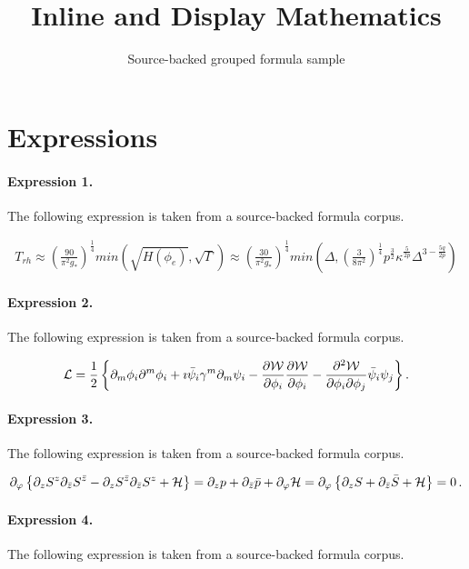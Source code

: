 \documentclass[11pt]{article}
\title{Inline and Display Mathematics}
\author{Source-backed grouped formula sample}
\date{}
\begin{document}
\maketitle
\section{Expressions}
\paragraph{Expression 1.} The following expression is taken from a source-backed formula corpus.

\begin{align*}T_{rh} \approx \left( \frac{90}{\pi^2g_{*}}\right)^{\frac{1}{4}} min\left(\sqrt{H(\phi_e)},\sqrt{\Gamma}\right)\approx \left(\frac{30}{\pi^2g_{*}}\right)^{\frac{1}{4}}min\left(\Delta,\left( \frac{3}{8\pi^2}\right)^{\frac{1}{4}}p^{\frac{3}{2}}\kappa^{\frac{5}{2p}}\Delta^{3-\frac{5q}{2p}}\right)\end{align*}

\paragraph{Expression 2.} The following expression is taken from a source-backed formula corpus.

\begin{align*}{\cal L} = \frac{1}{2} \left\{ \partial_{m}\phi_i \partial^{m}\phi_i + \imath\bar{\psi}_i \gamma^m \partial_m \psi_i - \frac{\partial {\cal W}}{\partial \phi_i}\frac{\partial {\cal W}}{\partial \phi_i} - \frac{\partial^2 {\cal W}}{\partial \phi_i\partial \phi_j} \bar{\psi}_i \psi_j \right\}.\end{align*}

\paragraph{Expression 3.} The following expression is taken from a source-backed formula corpus.

\begin{align*}\partial_{\varphi}\left\{ \partial_zS^{z}\partial_{\bar{z}} S^{\bar{z}} - \partial_{z}S^{\bar{z}} \partial_{\bar{z}} S^z+{\cal{H}}\right\}=\partial_z p+\partial_{\bar{z}}\bar{p}+\partial_{\varphi}{\cal H}=\partial_{\varphi}\left\{\partial_z S+\partial_{\bar{z}} \bar{S}+{\cal H}\right\}=0\,.\end{align*}

\paragraph{Expression 4.} The following expression is taken from a source-backed formula corpus.
\end{document}
